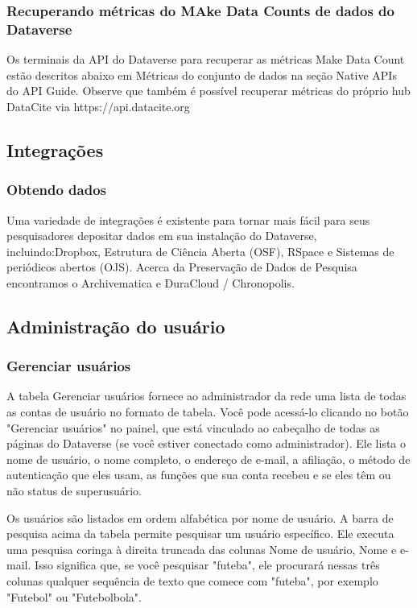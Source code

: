 \documentclass[12pt,hidelinks]{article}
\begin{document}
\subsubsection{Recuperando métricas do MAke Data Counts de dados do Dataverse}

\qquad Os terminais da API do Dataverse para recuperar as métricas Make Data Count estão descritos abaixo em Métricas do conjunto de dados na seção Native APIs do API Guide.
Observe que também é possível recuperar métricas do próprio hub DataCite via https://api.datacite.org


\subsection{Integrações}

\subsubsection{Obtendo dados}

\qquad Uma variedade de integrações é existente para tornar mais fácil para seus pesquisadores depositar dados em sua instalação do Dataverse, incluindo:Dropbox, Estrutura de Ciência Aberta (OSF), RSpace e Sistemas de periódicos abertos (OJS). Acerca da Preservação de Dados de Pesquisa encontramos o Archivematica e
DuraCloud / Chronopolis.

\subsection{Administração do usuário}

\subsubsection{Gerenciar usuários}

\qquad A tabela Gerenciar usuários fornece ao administrador da rede uma lista de todas as contas de usuário no formato de tabela. Você pode acessá-lo clicando no botão "Gerenciar usuários" no painel, que está vinculado ao cabeçalho de todas as páginas do Dataverse (se você estiver conectado como administrador). Ele lista o nome de usuário, o nome completo, o endereço de e-mail, a afiliação, o método de autenticação que eles usam, as funções que sua conta recebeu e se eles têm ou não status de superusuário.

Os usuários são listados em ordem alfabética por nome de usuário. A barra de pesquisa acima da tabela permite pesquisar um usuário específico. Ele executa uma pesquisa coringa à direita truncada das colunas Nome de usuário, Nome e e-mail. Isso significa que, se você pesquisar "futeba", ele procurará nessas três colunas qualquer sequência de texto que comece com "futeba", por exemplo "Futebol" ou "Futebolbola".
\end{document}
